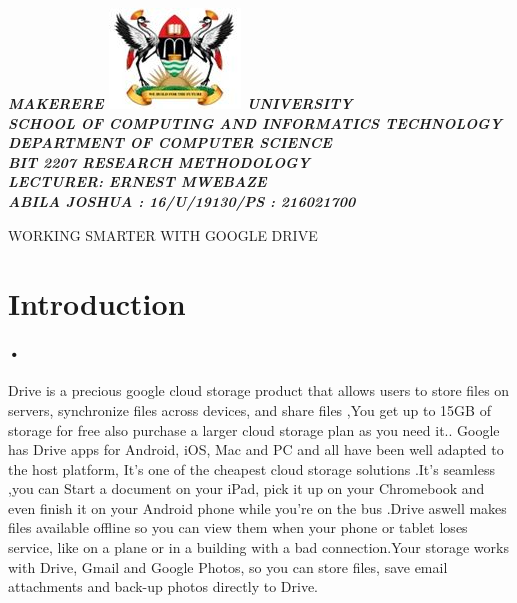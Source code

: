 \documentclass[11pt]{article}
\begin{document}
\begin{center}
\begin{normalsize}
\textbf\sl{MAKERERE \includegraphics[scale=0.5]{logo} UNIVERSITY }\\

\textbf\sl{SCHOOL OF COMPUTING AND INFORMATICS TECHNOLOGY} \\
\textbf\sl{DEPARTMENT OF COMPUTER SCIENCE} \\
\textbf\sl{BIT 2207 RESEARCH METHODOLOGY} \\
\textbf\sl{LECTURER: ERNEST MWEBAZE} \\
\textbf\sl{ABILA JOSHUA : 16/U/19130/PS : 216021700}\\

\newpage


\textsc{WORKING SMARTER WITH GOOGLE DRIVE }\\ 

\end{normalsize}
\end{center}

\section{Introduction}
\paragraph{•}
Drive is a precious google cloud storage product that\cite{A1} allows users to store files on servers, synchronize files across devices, and share files ,\cite{A2}You get up to 15GB of storage for free also purchase a larger cloud storage plan as you need it.. Google has Drive apps for Android, iOS, Mac and PC and all have been well adapted to the host platform,\cite{A3} It’s  one of the cheapest cloud storage solutions .It’s seamless ,you can Start a document on your iPad, pick it up on your Chromebook and even finish it on your Android phone while you’re on the bus .Drive aswell makes files available offline so you can view them when your phone or tablet loses service, like on a plane or in a building with a bad connection.\cite{A3}Your storage works with Drive, Gmail and Google Photos, so you can store files, save email attachments and back-up photos directly to Drive.
\end{document}
